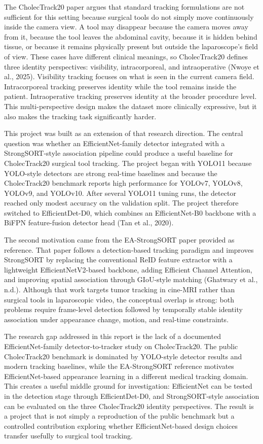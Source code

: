 \documentclass[12pt,a4paper]{article}
\begin{document}
The CholecTrack20 paper argues that standard tracking formulations are not sufficient for this setting because surgical tools do not simply move continuously inside the camera view. A tool may disappear because the camera moves away from it, because the tool leaves the abdominal cavity, because it is hidden behind tissue, or because it remains physically present but outside the laparoscope's field of view. These cases have different clinical meanings, so CholecTrack20 defines three identity perspectives: visibility, intracorporeal, and intraoperative (Nwoye et al., 2025). Visibility tracking focuses on what is seen in the current camera field. Intracorporeal tracking preserves identity while the tool remains inside the patient. Intraoperative tracking preserves identity at the broader procedure level. This multi-perspective design makes the dataset more clinically expressive, but it also makes the tracking task significantly harder.

This project was built as an extension of that research direction. The central question was whether an EfficientNet-family detector integrated with a StrongSORT-style association pipeline could produce a useful baseline for CholecTrack20 surgical tool tracking. The project began with YOLO11 because YOLO-style detectors are strong real-time baselines and because the CholecTrack20 benchmark reports high performance for YOLOv7, YOLOv8, YOLOv9, and YOLOv10. After several YOLO11 tuning runs, the detector reached only modest accuracy on the validation split. The project therefore switched to EfficientDet-D0, which combines an EfficientNet-B0 backbone with a BiFPN feature-fusion detector head (Tan et al., 2020).

The second motivation came from the EA-StrongSORT paper provided as reference. That paper follows a detection-based tracking paradigm and improves StrongSORT by replacing the conventional ReID feature extractor with a lightweight EfficientNetV2-based backbone, adding Efficient Channel Attention, and improving spatial association through GIoU-style matching (Ghatwary et al., n.d.). Although that work targets tumor tracking in cine-MRI rather than surgical tools in laparoscopic video, the conceptual overlap is strong: both problems require frame-level detection followed by temporally stable identity association under appearance change, motion, and real-time constraints.

The research gap addressed in this report is the lack of a documented EfficientNet-family detector-to-tracker study on CholecTrack20. The public CholecTrack20 benchmark is dominated by YOLO-style detector results and modern tracking baselines, while the EA-StrongSORT reference motivates EfficientNet-based appearance learning in a different medical tracking domain. This creates a useful middle ground for investigation: EfficientNet can be tested in the detection stage through EfficientDet-D0, and StrongSORT-style association can be evaluated on the three CholecTrack20 identity perspectives. The result is a project that is not simply a reproduction of the public benchmark but a controlled contribution exploring whether EfficientNet-based design choices transfer usefully to surgical tool tracking.
\end{document}
